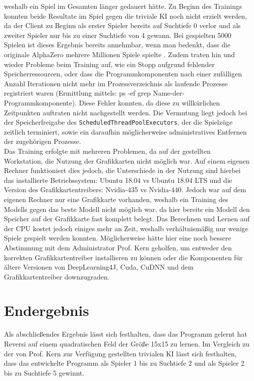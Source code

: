 \documentclass[12pt,a4paper]{article}
\begin{document}
weshalb ein Spiel im Gesamten länger gedauert hätte. Zu Beginn des Trainings konnten beide Resultate im Spiel gegen die triviale KI noch nicht erzielt werden, da der Client zu Beginn als erster Spieler bereits auf Suchtiefe 0 verlor und als zweiter Spieler nur bis zu einer Suchtiefe von 4 gewann. Bei gespielten 5000 Spielen ist dieses Ergebnis bereits annehmbar, wenn man bedenkt, dass die originale AlphaZero mehrere Millionen Spiele spielte \cite{Silver2017}. Zudem traten hin und wieder Probleme beim Training auf, wie ein Stopp aufgrund fehlender Speicherressourcen, oder dass die Programmkomponenten nach einer zufälligen Anzahl Iterationen nicht mehr im Prozessverzeichnis als laufende Prozesse registriert waren (Ermittlung mittels: ps -ef\:  \textbar\: grep \glqq Name-der-Programmkomponente\grqq{}). Diese Fehler konnten, da diese zu willkürlichen Zeitpunkten auftraten nicht nachgestellt werden. Die Vermutung liegt jedoch bei der Speicherfreigabe des \texttt{ScheduledThreadPoolExecutors}, der die Spielzüge zeitlich terminiert, sowie ein daraufhin möglicherweise administratives Entfernen der zugehörigen Prozesse. \\
Das Training erfolgte mit mehreren Problemen, da auf der gestellten Workstation, die Nutzung der Grafikkarten nicht möglich war. Auf einem eigenen Rechner funktioniert dies jedoch, die Unterschiede in der Nutzung sind hierbei das installierte Betriebssystem: Ubuntu 18.04 vs Ubuntu 18.04 LTS und die Version des Grafikkartentreibers: Nvidia-435 vs Nvidia-440. Jedoch war auf dem eigenen Rechner nur eine Grafikkarte vorhanden, weshalb ein Training des Modells gegen das beste Modell nicht möglich war, da hier bereits ein Modell den Speicher auf der Grafikkarte fast komplett belegt. Das Berechnen und Lernen auf der CPU kostet jedoch einiges mehr an Zeit, weshalb verhältnismäßig nur wenige Spiele gespielt werden konnten. Möglicherweise hätte hier eine noch bessere Abstimmung mit dem Administrator Prof. Kern geholfen, um entweder den korrekten Grafikkartentreiber installieren zu können oder die Komponenten für ältere Versionen von DeepLearning4J, Cuda, CuDNN und dem Grafikkartentreiber downzugraden.

\newpage

\section{Endergebnis}
Als abschließendes Ergebnis lässt sich festhalten, dass das Programm gelernt hat Reversi auf einem quadratischen Feld der Größe 15x15 zu lernen. Im Vergleich zu der von Prof. Kern zur Verfügung gestellten trivialen KI lässt sich festhalten, dass das entwickelte Programm als Spieler 1 bis zu Suchtiefe 2 und als Spieler 2 bis zu Suchtiefe 5 gewinnt.
\end{document}
